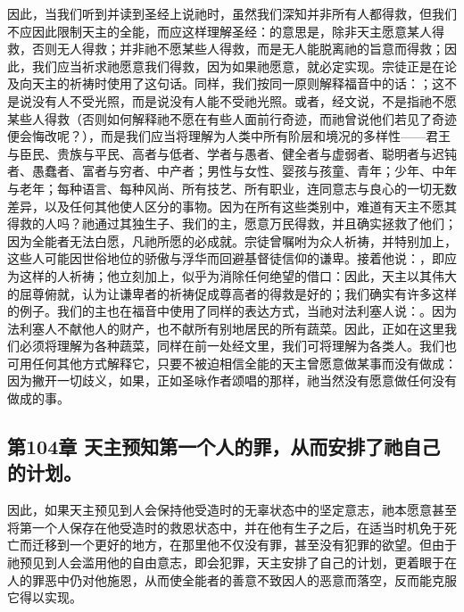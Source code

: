 因此，当我们听到并读到圣经上说祂时，虽然我们深知并非所有人都得救，但我们不应因此限制天主的全能，而应这样理解圣经：的意思是，除非天主愿意某人得救，否则无人得救；并非祂不愿某些人得救，而是无人能脱离祂的旨意而得救；因此，我们应当祈求祂愿意我们得救，因为如果祂愿意，就必定实现。宗徒正是在论及向天主的祈祷时使用了这句话。同样，我们按同一原则解释福音中的话：；这不是说没有人不受光照，而是说没有人能不受祂光照。或者，经文说，不是指祂不愿某些人得救（否则如何解释祂不愿在有些人面前行奇迹，而祂曾说他们若见了奇迹便会悔改呢？），而是我们应当将理解为人类中所有阶层和境况的多样性——君王与臣民、贵族与平民、高者与低者、学者与愚者、健全者与虚弱者、聪明者与迟钝者、愚蠢者、富者与穷者、中产者；男性与女性、婴孩与孩童、青年；少年、中年与老年；每种语言、每种风尚、所有技艺、所有职业，连同意志与良心的一切无数差异，以及任何其他使人区分的事物。因为在所有这些类别中，难道有天主不愿其得救的人吗？祂通过其独生子、我们的主，愿意万民得救，并且确实拯救了他们；因为全能者无法白愿，凡祂所愿的必成就。宗徒曾嘱咐为众人祈祷，并特别加上，这些人可能因世俗地位的骄傲与浮华而回避基督徒信仰的谦卑。接着他说：，即应为这样的人祈祷；他立刻加上，似乎为消除任何绝望的借口：因此，天主以其伟大的屈尊俯就，认为让谦卑者的祈祷促成尊高者的得救是好的；我们确实有许多这样的例子。我们的主也在福音中使用了同样的表达方式，当祂对法利塞人说：。因为法利塞人不献他人的财产，也不献所有别地居民的所有蔬菜。因此，正如在这里我们必须将理解为各种蔬菜，同样在前一处经文里，我们可将理解为各类人。我们也可用任何其他方式解释它，只要不被迫相信全能的天主曾愿意做某事而没有做成：因为撇开一切歧义，如果，正如圣咏作者颂唱的那样，祂当然没有愿意做任何没有做成的事。\par


\subsection{第104章 天主预知第一个人的罪，从而安排了祂自己的计划。}

因此，如果天主预见到人会保持他受造时的无辜状态中的坚定意志，祂本愿意甚至将第一个人保存在他受造时的救恩状态中，并在他有生子之后，在适当时机免于死亡而迁移到一个更好的地方，在那里他不仅没有罪，甚至没有犯罪的欲望。但由于祂预见到人会滥用他的自由意志，即会犯罪，天主安排了自己的计划，更着眼于在人的罪恶中仍对他施恩，从而使全能者的善意不致因人的恶意而落空，反而能克服它得以实现。\par

